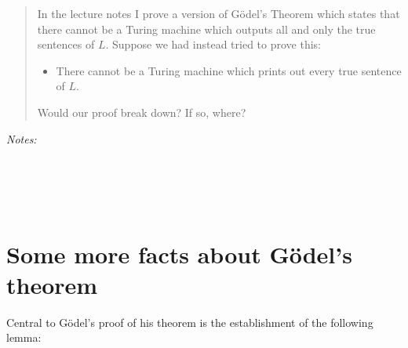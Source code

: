 \documentclass[justified]{tufte-handout}
\begin{document}
\begin{quote}
In the lecture notes I prove a version of G\"odel's Theorem which states that there cannot be a Turing machine which outputs all and only the true sentences of $L$. Suppose we had instead tried to prove this:
\begin{itemize}
\item There cannot be a Turing machine which prints out every true sentence of $L$.
\end{itemize}
Would our proof break down? If so, where?
\end{quote}

\noindent \emph{Notes:}  \underline{\hspace{15.4cm}}\\\\\underline{\hspace{16.43cm}}\\\\\underline{\hspace{16.43cm}}\\

\section{Some more facts about G\"odel's theorem}

Central to G\"odel's proof of his theorem is the establishment of the following lemma:
\end{document}
